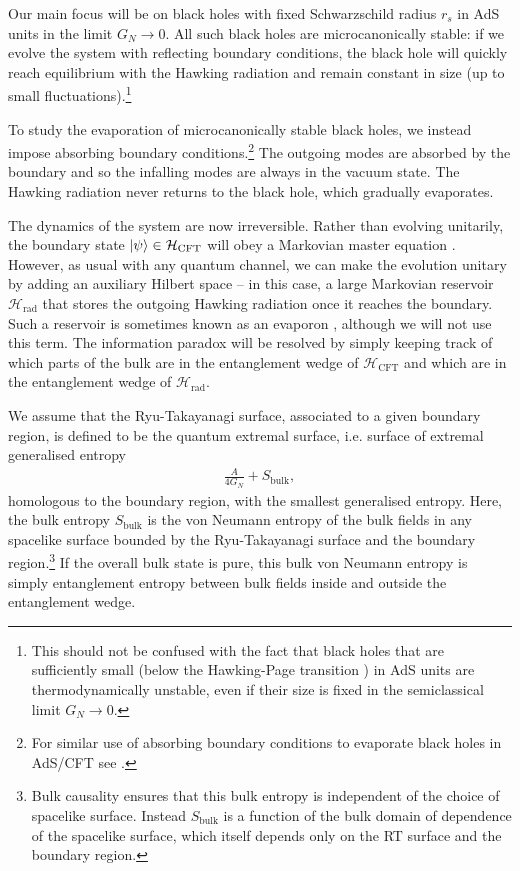 \documentclass[11pt,a4paper]{article}
\begin{document}
Our main focus will be on black holes with fixed Schwarzschild radius $r_s$ in AdS units in the limit $G_N \to 0$. All such black holes are microcanonically stable: if we evolve the system with reflecting boundary conditions, the black hole will quickly reach equilibrium with the Hawking radiation and remain constant in size (up to small fluctuations).\footnote{This should not be confused with the fact that black holes that are sufficiently small (below the Hawking-Page transition \cite{hawking1983thermodynamics}) in AdS units are thermodynamically unstable, even if their size is fixed in the semiclassical limit $G_N \to 0$.}

To study the evaporation of microcanonically stable black holes, we instead impose absorbing boundary conditions.\footnote{For similar use of absorbing boundary conditions to evaporate black holes in AdS/CFT see \cite{almheiri2018holographic, rocha2008evaporation, van2014evaporating}.} The outgoing modes are absorbed by the boundary and so the infalling modes are always in the vacuum state. The Hawking radiation never returns to the black hole, which gradually evaporates.

The dynamics of the system are now irreversible. Rather than evolving unitarily, the boundary state $\ket{\psi} \in \mathcal{H}_\text{CFT}$ will obey a Markovian master equation \cite{preskill1998lecture}. However, as usual with any quantum channel, we can make the evolution unitary by adding an auxiliary Hilbert space -- in this case, a large Markovian reservoir $\mathcal{H}_\text{rad}$ that stores the outgoing Hawking radiation once it reaches the boundary. Such a reservoir is sometimes known as an evaporon \cite{rocha2008evaporation}, although we will not use this term. The information paradox will be resolved by simply keeping track of which parts of the bulk are in the entanglement wedge of $\mathcal{H}_\text{CFT}$ and which are in the entanglement wedge of $\mathcal{H}_\text{rad}$.

We assume that the Ryu-Takayanagi surface, associated to a given boundary region, is defined to be the quantum extremal surface, i.e. surface of extremal generalised entropy
\begin{align} \label{eq:genentropy}
\frac{A}{4G_N} + S_\text{bulk},
\end{align}
homologous to the boundary region, with the smallest generalised entropy. Here, the bulk entropy $S_\text{bulk}$ is the von Neumann entropy of the bulk fields in any spacelike surface bounded by the Ryu-Takayanagi surface and the boundary region.\footnote{Bulk causality ensures that this bulk entropy is independent of the choice of spacelike surface. Instead $S_\text{bulk}$ is a function of the bulk domain of dependence of the spacelike surface, which itself depends only on the RT surface and the boundary region.} If the overall bulk state is pure, this bulk von Neumann entropy is simply entanglement entropy between bulk fields inside and outside the entanglement wedge. 
\end{document}
